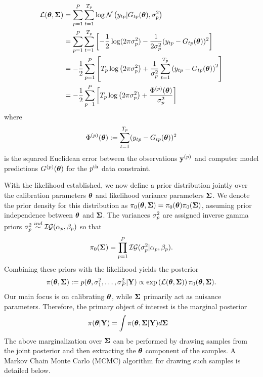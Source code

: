 \documentclass[12pt]{article}
\begin{document}
\begin{align}
\mathcal{L}(\boldsymbol{\theta}, \boldsymbol{\Sigma}) &= \sum_{p = 1}^{P} \sum_{t = 1}^{T_{p}} \log \mathcal{N}\left(y_{t p}| G_{t p}(\boldsymbol{\theta}), \sigma_{p}^2 \right) \nonumber \\
	         &= \sum_{p = 1}^{P}  \sum_{t = 1}^{T_{p}} \left[-\frac{1}{2} \log(2\pi \sigma_{p}^2) - \frac{1}{2\sigma_{p}^2} (y_{t p} - G_{t p}(\boldsymbol{\theta}))^2\right] \nonumber \\
	         &= -\frac{1}{2} \sum_{p = 1}^{P} \left[T_{p} \log\left(2\pi \sigma_{p}^2 \right) + \frac{1}{\sigma_{p}^2}\sum_{t = 1}^{T_{p}} \left(y_{t p} - 
	                G_{t p}(\boldsymbol{\theta})\right)^2  \right] \nonumber \\
	         &= -\frac{1}{2} \sum_{p = 1}^{P} \left[T_{p} \log\left(2\pi \sigma_{p}^2 \right) + \frac{\Phi^{(p)}(\boldsymbol{\theta})}{\sigma_{p}^2} \right] \label{llik}
\end{align}
where 
\begin{align}
\Phi^{(p)}(\boldsymbol{\theta}) := \sum_{t = 1}^{T_{p}} (y_{t p} - G_{t p}(\boldsymbol{\theta}))^2
\end{align}
is the squared Euclidean error between the observations $\mathbf{y}^{(p)}$ and computer model predictions $G^{(p)}(\boldsymbol{\theta})$ for the $p^{\text{th}}$ data constraint. 

With the likelihood established, we now define a prior distribution jointly over the calibration parameters $\boldsymbol{\theta}$ and likelihood variance parameters $\boldsymbol{\Sigma}$. 
We denote the prior density for this distribution as $\pi_0(\boldsymbol{\theta}, \boldsymbol{\Sigma}) = \pi_0(\boldsymbol{\theta})\pi_0(\boldsymbol{\Sigma})$, assuming prior independence between $\boldsymbol{\theta}$ and $\boldsymbol{\Sigma}$.  
The variances $\sigma_{p}^2$ are assigned inverse gamma priors $\sigma_{p}^2 \overset{ind}{\sim} \mathcal{IG}(\alpha_p, \beta_p)$ so that 
\begin{align}
\pi_0(\boldsymbol{\Sigma}) = \prod_{p = 1}^{P} \mathcal{IG}(\sigma_{p}^2|\alpha_p, \beta_p). \label{inv_gamma_prior}
\end{align}
Combining these priors with the likelihood yields the posterior 
\begin{align}
\pi(\boldsymbol{\theta}, \boldsymbol{\Sigma}) := p(\boldsymbol{\theta}, \sigma_{1}^2, \dots, \sigma_{P}^2|\mathbf{Y}) \propto \exp\left(\mathcal{L}(\boldsymbol{\theta}, \boldsymbol{\Sigma})\right)\pi_0(\boldsymbol{\theta}, \boldsymbol{\Sigma}). \label{posterior_density}
\end{align}
Our main focus is on calibrating $\boldsymbol{\theta}$, while $\boldsymbol{\Sigma}$ primarily act as nuisance parameters. Therefore, the primary object of interest is the marginal posterior
\begin{align*}
\pi(\boldsymbol{\theta}|\mathbf{Y}) &= \int \pi(\boldsymbol{\theta}, \boldsymbol{\Sigma}|\mathbf{Y}) d\boldsymbol{\Sigma} 
\end{align*}
The above marginalization over $\boldsymbol{\Sigma}$ can be performed by drawing samples from the joint posterior and then extracting the $\boldsymbol{\theta}$ component of the samples. A 
Markov Chain Monte Carlo (MCMC) algorithm for drawing such samples is detailed below.  
\end{document}
